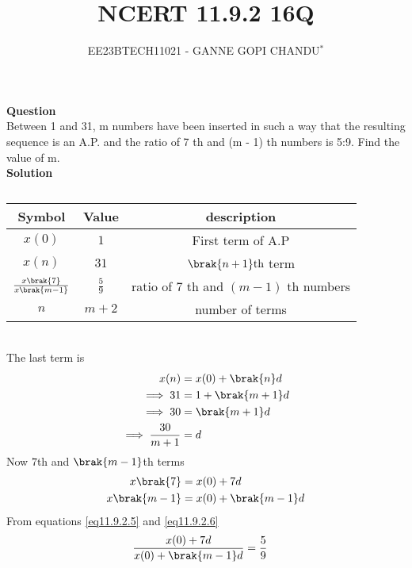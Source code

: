\documentclass[journal,12pt,onecolumn]{IEEEtran}
\theoremstyle{remark}
\begin{document}

\vspace{3cm}
\title{NCERT 11.9.2 16Q}
\author{EE23BTECH11021 - GANNE GOPI CHANDU$^{*}$%
}
\maketitle
\bigskip
\renewcommand{\thefigure}{\theenumi}
\renewcommand{\thetable}{\theenumi}

\textbf{Question}\\
Between 1 and 31, m numbers have been inserted in such a way that the resulting sequence is an A.P. and 
the ratio of 7 th and (m - 1) th numbers is 5:9. Find the value of m.\\
\textbf{Solution}\\
\fi
\begin{table}[!h]
\begin{center}
\renewcommand\thetable{1}
\begin{tabular}{ |c|c|c| } 
  \hline
    Symbol & Value & description \\ 
  \hline
  $x(0)$ & $1$ & First term of A.P  \\ 
  \hline
  $x(n)$ & $31$ & $\brak{n+1}\text{th}$ term \\
  \hline
  $\frac{x\brak{7}}{x\brak{m-1}}$ & $\frac{5}{9}$ & ratio of $7$ th  and $(m-1)$ th numbers\\ 
  \hline
  $n$ & $m+2$ & number of terms \\
  \hline
\end{tabular}
\end{center}
\caption{}
\end{table}\\
The last term is
\begin{align}
x(n)&=x(0)+\brak{n}d\\
\implies31 &= 1 + \brak{m + 1}d \\
\implies30 &= \brak{m + 1}d \\
\implies\frac{30}{m + 1} &= d \label{eq11.9.2.4}
\end{align}
Now $7$th and $\brak{m-1}$th terms
\begin{align}
x\brak{7} &= x(0) + 7d\label{eq11.9.2.5}\\
x\brak{m-1} &= x(0) + \brak{m-1}d\label{eq11.9.2.6}
\end{align}
From  equations \eqref{eq11.9.2.5} and \eqref{eq11.9.2.6}\\
\begin{align}
   \frac{x(0) + 7d}{x(0) + \brak{m-1}d} &= \frac{5}{9} \label{eq11.9.2.7}
\end{align}
\end{document}
